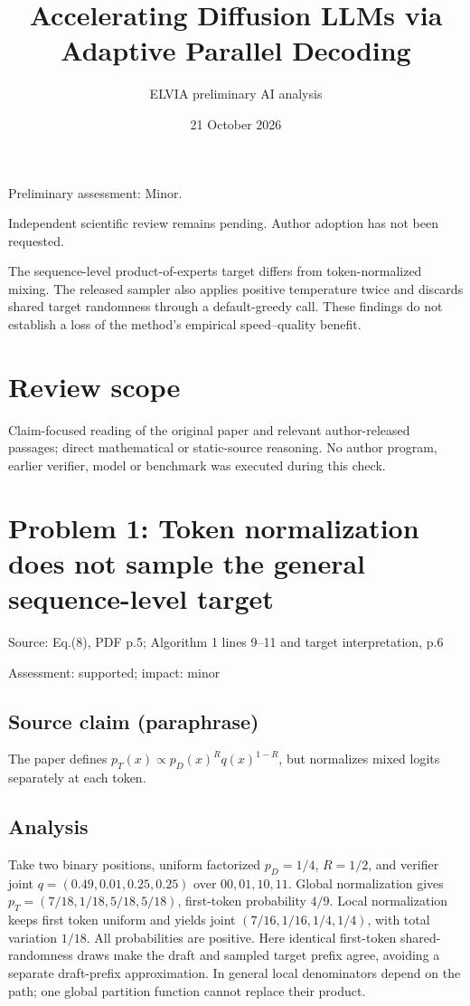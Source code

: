 \documentclass[11pt]{article}
\begin{document}
\title{Accelerating Diffusion LLMs via Adaptive Parallel Decoding}

\author{ELVIA preliminary AI analysis}\date{21 October 2026}\maketitle

Preliminary assessment: Minor.\par

Independent scientific review remains pending. Author adoption has not been requested.

The sequence-level product-of-experts target differs from token-normalized mixing. The released sampler also applies positive temperature twice and discards shared target randomness through a default-greedy call. These findings do not establish a loss of the method’s empirical speed–quality benefit.

\section*{Review scope}

Claim-focused reading of the original paper and relevant author-released passages; direct mathematical or static-source reasoning. No author program, earlier verifier, model or benchmark was executed during this check.

\section*{Problem 1: Token normalization does not sample the general sequence-level target}

Source: Eq.(8), PDF p.5; Algorithm 1 lines 9–11 and target interpretation, p.6

Assessment: supported; impact: minor

\subsection*{Source claim (paraphrase)}

The paper defines \(p_T(x)\propto p_D(x)^R q(x)^{1-R}\), but normalizes mixed logits separately at each token.

\subsection*{Analysis}

Take two binary positions, uniform factorized \(p_D=1/4\), \(R=1/2\), and verifier joint \(q=(0.49,0.01,0.25,0.25)\) over \(00,01,10,11\). Global normalization gives \(p_T=(7/18,1/18,5/18,5/18)\), first-token probability \(4/9\). Local normalization keeps first token uniform and yields joint \((7/16,1/16,1/4,1/4)\), with total variation \(1/18\). All probabilities are positive. Here identical first-token shared-randomness draws make the draft and sampled target prefix agree, avoiding a separate draft-prefix approximation. In general local denominators depend on the path; one global partition function cannot replace their product.
\end{document}
